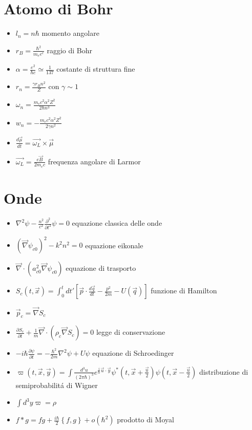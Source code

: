 \documentclass[a4paper]{article}
\begin{document}
    \section{Atomo di Bohr}
        \begin{itemize}
            \item $l_n=n\hbar$ momento angolare
            \item $r_B=\frac{\hbar^2}{m_ee^e}$ raggio di Bohr
            \item $\alpha=\frac{e^2}{\hbar c}\simeq\frac{1}{137}$ costante di struttura fine
            \item $r_n=\frac{\gamma r_Bn^2}{Z}$ con $\gamma\sim 1$
            \item $\omega_n=\frac{m_ec^2\alpha^2Z^2}{2\hbar n^3}$
            \item $w_n=-\frac{m_ec^2\alpha^2Z^2}{2\gamma n^2}$
            \item $\frac{d\vec{\mu}}{dt}=\vec{\omega_L}\times\vec{\mu}$
            \item $\vec{\omega_L}=\frac{e\vec{B}}{2m_ec}$ frequenza angolare di Larmor
        \end{itemize}
    
    \section{Onde}
        \begin{itemize}
            \item $\nabla^2\psi-\frac{n^2}{c^2}\frac{\partial^2}{\partial t^2}\psi=0$ equazione classica delle onde
            \item $(\vec{\nabla}\psi_{c0})^2-k^2n^2=0$ equazione eikonale
            \item $\vec{\nabla}\cdot(a_{c0}^2\vec{\nabla}\psi_{c0})$ equazione di trasporto
            \item $S_c(t,\vec{x})=\int_0^t dt'\left[\vec{p}\cdot\frac{d\vec{q}}{dt}-\frac{p^2}{2m}-U(\vec{q})\right]$ funzione di Hamilton
            \item $\vec{p}_c=\vec{\nabla}S_c$
            \item $\frac{\partial S_c}{\partial t}+\frac{1}{m}\vec{\nabla}\cdot(\rho_c\vec{\nabla}S_c)=0$ legge di conservazione
            \item $-i\hbar\frac{\partial\psi}{\partial t}=-\frac{\hbar^2}{2m}\nabla^2\psi+U\psi$ equazione di Schroedinger
            \item $\varpi(t,\vec{x},\vec{y})=\int\frac{d^3u}{(2\pi\hbar)^3}e^{\frac{i}{\hbar}\vec{u}\cdot\vec{y}}\psi^\ast(t,\vec{x}+\frac{\vec{u}}{2})\psi(t,\vec{x}-\frac{\vec{u}}{2})$ distribuzione di semiprobabilit\'a di Wigner
            \item $\int d^3y\varpi=\rho$
            \item $f\ast g=fg+\frac{i\hbar}{2}\left\{f,g\right\}+o(\hbar^2)$ prodotto di Moyal
        \end{itemize}
    
\end{document}
